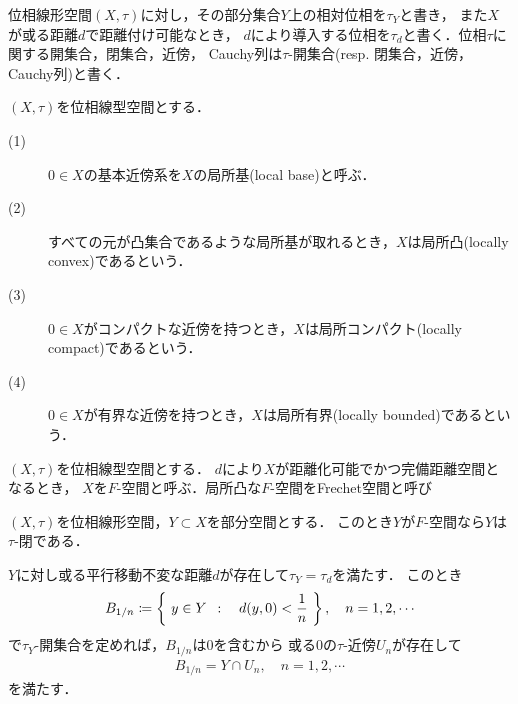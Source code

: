 	\begin{screen}
		\begin{thm}
		\end{thm}
	\end{screen}
	
	位相線形空間$(X,\tau)$に対し，その部分集合$Y$上の相対位相を$\tau_Y$と書き，
	また$X$が或る距離$d$で距離付け可能なとき，
	$d$により導入する位相を$\tau_d$と書く．位相$\tau$に関する開集合，閉集合，近傍，
	Cauchy列は$\tau$-開集合(resp. 閉集合，近傍，Cauchy列)と書く．
	
	\begin{screen}
		\begin{dfn}
			$(X,\tau)$を位相線型空間とする．
			\begin{description}
				\item[(1)] $0 \in X$の基本近傍系を$X$の局所基(local base)と呼ぶ．
				\item[(2)] すべての元が凸集合であるような局所基が取れるとき，$X$は局所凸(locally convex)であるという．
				\item[(3)] $0 \in X$がコンパクトな近傍を持つとき，$X$は局所コンパクト(locally compact)であるという．
				\item[(4)] $0 \in X$が有界な近傍を持つとき，$X$は局所有界(locally bounded)であるという．
			\end{description}
		\end{dfn}
	\end{screen}
	
	\begin{screen}
		\begin{dfn}
			$(X,\tau)$を位相線型空間とする．
			$d$により$X$が距離化可能でかつ完備距離空間となるとき，
			$X$を$F$-空間と呼ぶ．局所凸な$F$-空間をFrechet空間と呼び
		\end{dfn}
	\end{screen}
	
	\begin{screen}
		\begin{thm}
			$(X,\tau)$を位相線形空間，$Y \subset X$を部分空間とする．
			このとき$Y$が$F$-空間なら$Y$は$\tau$-閉である．
		\end{thm}
	\end{screen}
	
	\begin{prf}
		$Y$に対し或る平行移動不変な距離$d$が存在して$\tau_Y = \tau_d$を満たす．
		このとき
		\begin{align}
			B_{1/n} \coloneqq \left\{\ y \in Y\ \, : \quad d(y,0) < \frac{1}{n}\ \right\},
			\quad n=1,2,\cdots
		\end{align}
		で$\tau_Y$-開集合を定めれば，$B_{1/n}$は$0$を含むから
		或る0の$\tau$-近傍$U_n$が存在して
		\begin{align}
			B_{1/n} = Y \cap U_n, \quad n=1,2,\cdots
		\end{align}
		を満たす．
	\end{prf}
	
